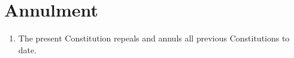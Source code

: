 \section{Annulment}
\label{annulment}

\begin{enumerate}
 \item The present Constitution repeals and annuls all previous Constitutions to date.
\end{enumerate}
